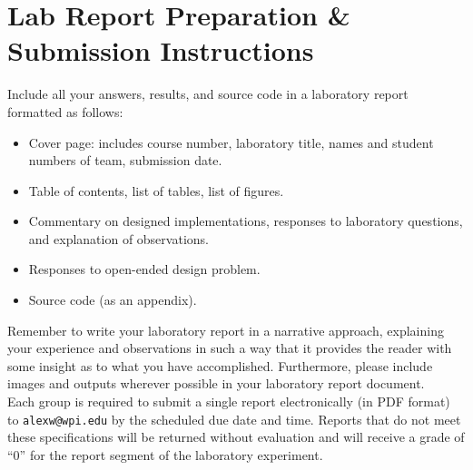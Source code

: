 \documentclass[letterpaper,12pt]{article}
\begin{document}
\section{Lab Report Preparation \& Submission Instructions}
Include all your answers, results, and source code in a laboratory
report formatted as follows:
\begin{itemize}
 \item Cover page: includes course number, laboratory title, names and student numbers of team, submission
 date.
 \item Table of contents, list of tables, list of figures.
 \item Commentary on designed implementations, responses to laboratory questions, and explanation of
 observations.
 \item Responses to open-ended design problem.
 \item Source code (as an appendix).
\end{itemize}

Remember to write your laboratory report in a narrative approach, explaining your experience and observations in such a way that it provides the reader with some insight as to what you have accomplished.  Furthermore, please include images and outputs wherever possible in your laboratory report document.\\

\noindent Each group is required to submit a single report
electronically (in PDF format) to \texttt{alexw@wpi.edu} by the scheduled due date and time.
Reports that do not meet these specifications will be returned
without evaluation and will receive a grade of ``0'' for the report
segment of the laboratory experiment.


\newpage


\end{document}
